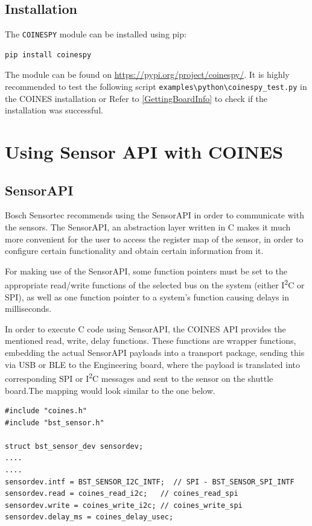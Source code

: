 \documentclass[11pt,headings=small]{scrartcl}
\begin{document}
\subsection{Installation}

The \texttt{COINESPY} module can be installed using pip:
\begin{lstlisting}
pip install coinespy
\end{lstlisting}
The module can be found on \url{https://pypi.org/project/coinespy/}.
It is highly recommended to test the following script \texttt{examples\textbackslash python\textbackslash coinespy\_test.py}  in the COINES installation or Refer to \ref{GettingBoardInfo} to check if the installation was successful.

\newpage
\section{Using Sensor API with COINES}
\subsection{SensorAPI}
Bosch Sensortec recommends using the SensorAPI in order to communicate with the sensors. The SensorAPI, an abstraction layer written in C makes it much more convenient for the user to access the register map of the sensor, in order to configure certain functionality and obtain certain information from it.

For making use of the SensorAPI, some function pointers must be set to the appropriate read/write functions of the selected bus on the system (either I\textsuperscript{2}C or SPI), as well as one function pointer to a system's function causing delays in milliseconds.

In order to execute C code using SensorAPI, the COINES API provides the mentioned read, write, delay functions. These functions are wrapper functions, embedding the actual SensorAPI payloads into a transport package, sending this via USB or BLE to the Engineering board, where the payload is translated into corresponding SPI or I\textsuperscript{2}C messages and sent to the sensor on the shuttle board.The mapping would look similar to the one below.

\begin{lstlisting}
#include "coines.h"
#include "bst_sensor.h"

struct bst_sensor_dev sensordev;
....
....
sensordev.intf = BST_SENSOR_I2C_INTF;  // SPI - BST_SENSOR_SPI_INTF
sensordev.read = coines_read_i2c;   // coines_read_spi
sensordev.write = coines_write_i2c; // coines_write_spi
sensordev.delay_ms = coines_delay_usec;

\end{lstlisting}
\end{document}
